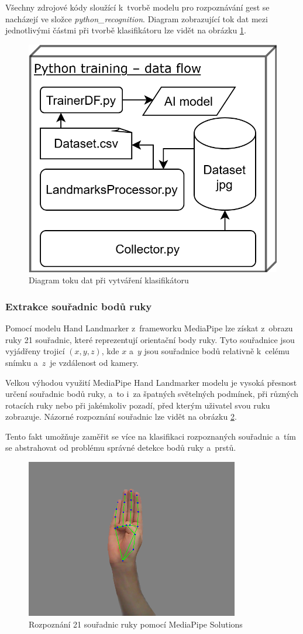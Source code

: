 \documentclass[
  master,
  program=ainfvs,
  biblatex,
  figures=true,
  tables=false,
  sourcecodes=true,
  glossaries,
  index
]{kidiplom}
\begin{document}
        Všechny zdrojové kódy sloužící k~tvorbě modelu pro rozpoznávání gest se nacházejí ve složce \emph{python\_recognition}. Diagram zobrazující tok dat mezi jednotlivými částmi při tvorbě klasifikátoru lze vidět na obrázku \ref{python-training-flow-diagram}.

        \begin{figure}[htbp]
            \centering
            \includegraphics[width=0.5\columnwidth]{graphics/python-training-flow-diagram.png}
            \caption{Diagram toku dat při vytváření klasifikátoru}
            \label{python-training-flow-diagram}
        \end{figure}
        
        \subsubsection{Extrakce souřadnic bodů ruky}
           Pomocí modelu Hand Landmarker z~frameworku MediaPipe lze získat z~obrazu ruky 21 souřadnic, které reprezentují orientační body ruky. Tyto souřadnice jsou vyjádřeny trojicí $(x, y, z)$, kde $x$ a~$y$ jsou souřadnice bodů relativně k~celému snímku a~$z$~je vzdálenost od kamery.

           Velkou výhodou využití MediaPipe Hand Landmarker modelu je vysoká přesnost určení souřadnic bodů ruky, a~to i~za špatných světelných podmínek, při různých rotacích ruky nebo při jakémkoliv pozadí, před kterým uživatel svou ruku zobrazuje. Názorné rozpoznání souřadnic lze vidět na obrázku \ref{mediapipe}.
           
           Tento fakt umožňuje zaměřit se více na klasifikaci rozpoznaných souřadnic a~tím se abstrahovat od problému správné detekce bodů ruky a~prstů.

         \begin{figure}[htbp]
            \centering
            \includegraphics[width=0.5\columnwidth]{graphics/mediapipe.png}
            \caption{Rozpoznání 21 souřadnic ruky pomocí MediaPipe Solutions}
            \label{mediapipe}
        \end{figure}
           
\end{document}
